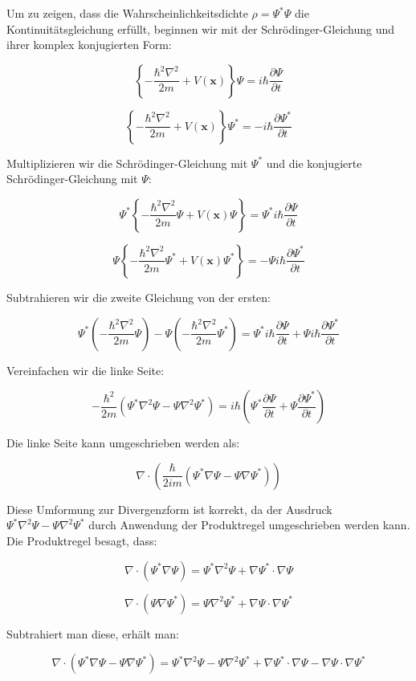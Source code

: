 Um zu zeigen, dass die Wahrscheinlichkeitsdichte \(\rho = \Psi^* \Psi\) die Kontinuitätsgleichung erfüllt, beginnen wir mit der Schrödinger-Gleichung und ihrer komplex konjugierten Form:

\[
\left\{-\frac{\hbar^2 \nabla^2}{2 m} + V(\mathbf{x})\right\} \Psi = i \hbar \frac{\partial \Psi}{\partial t}
\]

\[
\left\{-\frac{\hbar^2 \nabla^2}{2 m} + V(\mathbf{x})\right\} \Psi^* = -i \hbar \frac{\partial \Psi^*}{\partial t}
\]

Multiplizieren wir die Schrödinger-Gleichung mit \(\Psi^*\) und die konjugierte Schrödinger-Gleichung mit \(\Psi\):

\[
\Psi^* \left\{-\frac{\hbar^2 \nabla^2}{2 m} \Psi + V(\mathbf{x}) \Psi\right\} = \Psi^* i \hbar \frac{\partial \Psi}{\partial t}
\]

\[
\Psi \left\{-\frac{\hbar^2 \nabla^2}{2 m} \Psi^* + V(\mathbf{x}) \Psi^*\right\} = -\Psi i \hbar \frac{\partial \Psi^*}{\partial t}
\]

Subtrahieren wir die zweite Gleichung von der ersten:

\[
\Psi^* \left(-\frac{\hbar^2 \nabla^2}{2 m} \Psi\right) - \Psi \left(-\frac{\hbar^2 \nabla^2}{2 m} \Psi^*\right) = \Psi^* i \hbar \frac{\partial \Psi}{\partial t} + \Psi i \hbar \frac{\partial \Psi^*}{\partial t}
\]

Vereinfachen wir die linke Seite:

\[
-\frac{\hbar^2}{2 m} \left(\Psi^* \nabla^2 \Psi - \Psi \nabla^2 \Psi^*\right) = i \hbar \left(\Psi^* \frac{\partial \Psi}{\partial t} + \Psi \frac{\partial \Psi^*}{\partial t}\right)
\]

Die linke Seite kann umgeschrieben werden als:

\[
\nabla \cdot \left(\frac{\hbar}{2 i m} \left(\Psi^* \nabla \Psi - \Psi \nabla \Psi^*\right)\right)
\]

Diese Umformung zur Divergenzform ist korrekt, da der Ausdruck \(\Psi^* \nabla^2 \Psi - \Psi \nabla^2 \Psi^*\) durch Anwendung der Produktregel umgeschrieben werden kann. Die Produktregel besagt, dass:

\[
\nabla \cdot (\Psi^* \nabla \Psi) = \Psi^* \nabla^2 \Psi + \nabla \Psi^* \cdot \nabla \Psi
\]

\[
\nabla \cdot (\Psi \nabla \Psi^*) = \Psi \nabla^2 \Psi^* + \nabla \Psi \cdot \nabla \Psi^*
\]

Subtrahiert man diese, erhält man:

\[
\nabla \cdot (\Psi^* \nabla \Psi - \Psi \nabla \Psi^*) = \Psi^* \nabla^2 \Psi - \Psi \nabla^2 \Psi^* + \nabla \Psi^* \cdot \nabla \Psi - \nabla \Psi \cdot \nabla \Psi^*
\]

